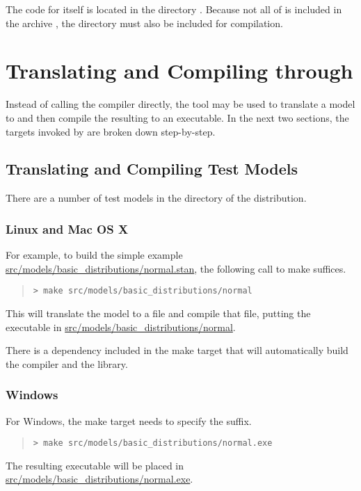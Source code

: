 The code for \Stan itself is located in the directory
.  Because not all of \Stan is included in the
archive , the  directory must also be
included for compilation.



\chapter{Translating and Compiling through }\label{make-models.chapter}

Instead of calling the \Cpp compiler directly, the  tool
may be used to translate a \Stan model to \Cpp and then compile the
resulting \Cpp to an executable.  In the next two sections, the
targets invoked by  are broken down step-by-step.

\section{Translating and Compiling Test Models}

There are a number of test models in the directory 
of the distribution.  

\subsection{Linux and Mac OS X}

For example, to build the simple example
\url{src/models/basic\_distributions/normal.stan}, the following call
to make suffices.
%
\begin{quote}
\begin{Verbatim}[fontshape=sl]
> make src/models/basic_distributions/normal
\end{Verbatim}
\end{quote}
%
This will translate the model  to a \Cpp file and
compile that \Cpp file, putting the executable in
\url{src/models/basic_distributions/normal}.

There is a dependency included in the make target that will
automatically build the  compiler and
the  library.

\subsection{Windows}

For Windows, the make target needs to specify the  suffix.
%
\begin{quote}
\begin{Verbatim}[fontshape=sl]
> make src/models/basic_distributions/normal.exe
\end{Verbatim}
\end{quote}
%
The resulting executable will be placed in
\url{src/models/basic_distributions/normal.exe}.


